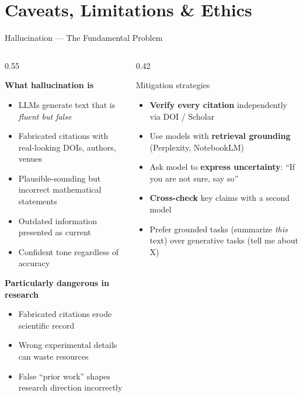 
\section{Caveats, Limitations \& Ethics}

\begin{frame}{Hallucination — The Fundamental Problem}
  \begin{columns}[T, onlytextwidth]
    \begin{column}{0.55\textwidth}
      {\small
      \textbf{What hallucination is}\\[0.2em]
      \begin{itemize}
        \item LLMs generate text that is \emph{fluent but false}~\parencite{huang2023hallucination}
        \item Fabricated citations with real-looking DOIs, authors, venues
        \item Plausible-sounding but incorrect mathematical statements
        \item Outdated information presented as current
        \item Confident tone regardless of accuracy
      \end{itemize}
      \vspace{0.3em}
      \textbf{Particularly dangerous in research}\\[0.2em]
      \begin{itemize}
        \item Fabricated citations erode scientific record
        \item Wrong experimental details can waste resources
        \item False ``prior work'' shapes research direction incorrectly
      \end{itemize}}
    \end{column}
    \hfill
    \begin{column}{0.42\textwidth}
      \begin{block}{Mitigation strategies}
        {\small\begin{itemize}
          \item \textbf{Verify every citation} independently via DOI / Scholar
          \item Use models with \textbf{retrieval grounding} (Perplexity, NotebookLM)
          \item Ask model to \textbf{express uncertainty}: ``If you are not sure, say so''
          \item \textbf{Cross-check} key claims with a second model
          \item Prefer grounded tasks (summarize \emph{this} text) over generative tasks (tell me about X)
        \end{itemize}}
      \end{block}
    \end{column}
  \end{columns}
\end{frame}

